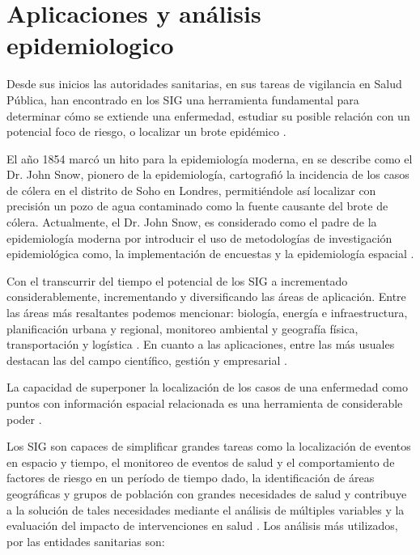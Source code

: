 \section{Aplicaciones y análisis epidemiologico}
\label{sec:cap2-aplicaciones-analisis-epidemiologico}
Desde sus inicios las autoridades sanitarias, en sus tareas de vigilancia en Salud Pública, han
encontrado en los SIG una herramienta fundamental para determinar cómo se extiende una enfermedad,
estudiar su posible relación con un potencial foco de riesgo, o localizar un brote epidémico
\citep{vgomesAegis2001}.

El año 1854 marcó un hito para la epidemiología moderna, en \citet{jCerdaJohnSnow2007} se describe
como el Dr. John Snow, pionero de la epidemiología, cartografió la incidencia de los casos de
cólera en el distrito de Soho en Londres, permitiéndole así localizar con precisión un pozo de
agua contaminado como la fuente causante del brote de cólera. Actualmente, el Dr. John Snow, es
considerado como el padre de la epidemiología moderna por introducir el uso de  metodologías de
investigación epidemiológica como, la implementación de encuestas y la epidemiología espacial
\citep{jCerdaJohnSnow2007}.

Con el transcurrir del tiempo el potencial de los SIG a incrementado considerablemente,  incrementando y diversificando las áreas de aplicación. Entre las áreas más resaltantes podemos
mencionar: biología, energía e infraestructura, planificación urbana y regional, monitoreo
ambiental y geografía física, transportación y logística \citep{fAlonsoSig2006}. En cuanto a las
aplicaciones, entre las más usuales destacan las del campo científico, gestión y empresarial
\citep{fAlonsoSig2006}.

La capacidad de superponer la localización de los casos de una enfermedad como puntos con
información espacial relacionada es una herramienta de considerable poder
\citep{iMolinaSigEpidemiologia}.

Los SIG son capaces de simplificar grandes tareas como la localización de eventos en espacio y
tiempo, el monitoreo de eventos de salud y el comportamiento de factores de riesgo en un período
de tiempo dado, la identificación de áreas geográficas y grupos de población con grandes
necesidades de salud y contribuye a la solución de tales necesidades mediante el análisis de
múltiples variables y la evaluación del impacto de intervenciones en salud
\citep{iMolinaSigEpidemiologia}. Los análisis más utilizados, por las entidades sanitarias son:

